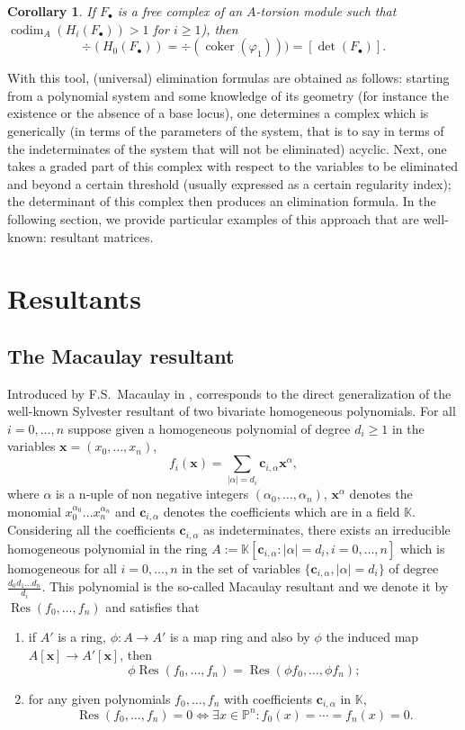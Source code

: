 \documentclass[10pt]{amsart}
\theoremstyle{plain}
\newtheorem{cor}[thm]{Corollary}
\theoremstyle{definition}
\def\PP{{\mathbb{P}}}
\def\KK{{\mathbb{K}}}
\def\c{{\mathbf{c}}}
\def\x{\mathbf{x}}
\def\F.{F_\bullet}
\DeclareMathOperator\Res{Res}
\DeclareMathOperator\codim{codim}
\DeclareMathOperator\coker{coker}
\begin{document}
\begin{cor} 
If $\F.$ is a free complex of an $A$-torsion module such that $\codim_A(H_i(\F.))> 1$ for $i\geq 1$), then
\[
\div(H_0(\F.))=\div(\coker(\varphi_1)))=[\det(\F.)].
\]
\end{cor}

\medskip

With this tool, (universal) elimination formulas are obtained as follows: starting from a polynomial system and some knowledge of its geometry  (for instance the existence or the absence of a base locus), one determines a complex which is generically (in terms of the parameters of the system, that is to say in terms of the indeterminates of the system that will not be eliminated) acyclic. Next, one takes a graded part of this complex with respect to the variables to be eliminated and beyond a certain threshold (usually expressed as a certain regularity index); the determinant of this complex then produces an elimination formula. In the following section, we provide particular examples of this approach that are well-known: resultant matrices.  



\section{Resultants}\label{secResultants}

\subsection{The Macaulay resultant}
Introduced by F.S.\ Macaulay in {\cite{Mac02}},
corresponds to the direct generalization of the well-known Sylvester
resultant of two bivariate homogeneous polynomials. For all
$i=0,\ldots,n$ suppose given a homogeneous polynomial of degree
$d_i\geq 1$ in the variables $\x=(x_0,\ldots,x_n)$,
$$f_i(\x)=\sum_{|\alpha|=d_i}\c_{i,\alpha} \x^\alpha,$$
where $\alpha$
is a n-uple of non negative integers $(\alpha_0,\ldots,\alpha_n)$,
$\x^\alpha$ denotes the monomial $x_0^{\alpha_0}\ldots x_n^{\alpha_n}$
and $\c_{i,\alpha}$ denotes the coefficients which are in a field
$\KK$. Considering all the coefficients $\c_{i,\alpha}$ as
indeterminates, there exists an irreducible homogeneous polynomial in
the ring $A:=\KK[\c_{i,\alpha} : |\alpha|=d_i, i=0,\ldots,n]$ which is
homogeneous for all $i=0,\ldots,n$ in the set of variables
$\{\c_{i,\alpha}, |\alpha|=d_i\}$ of degree $\frac{d_0d_1\ldots
  d_n}{d_i}$. This polynomial is the so-called Macaulay resultant and
we denote it by $\Res(f_0,\hdots,f_n)$ and satisfies that
\begin{enumerate}
\item if $A'$ is a ring, $\phi:A\to A'$ is a map ring and also by $\phi$ the induced map $A[\x]\to A'[\x]$, then 
\[
 \phi \Res(f_0,\hdots,f_n) = \Res(\phi f_0,\hdots, \phi f_n);
\]
\item for any given
polynomials $f_0,\ldots,f_n$ with coefficients $\c_{i,\alpha}$ in
$\KK$, 
\[
 \Res(f_0,\ldots,f_n)=0 \Leftrightarrow \exists x\in \PP^n : f_0(x)=\cdots=f_n(x)=0.
\]
\end{enumerate} 
\end{document}

